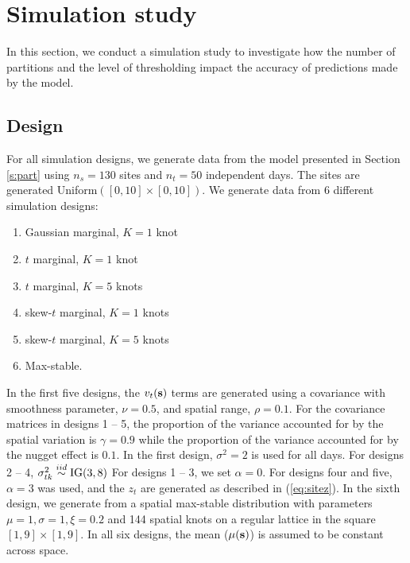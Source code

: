 \documentclass[11pt]{article}
\begin{document}
\section{Simulation study}\label{s:simstudy}
In this section, we conduct a simulation study to investigate how the number of partitions and the level of thresholding impact the accuracy of predictions made by the model.

\subsection{Design}\label{s:simdesign}
For all simulation designs, we generate data from the model presented in Section \ref{s:part} using $n_s=130$ sites and $n_t=50$ independent days.
The sites are generated Uniform$([0, 10] \times [0, 10])$.
We generate data from 6 different simulation designs:
\begin{enumerate} \setlength{\itemsep}{-0.5em}
  \item Gaussian marginal, $K=1$ knot
  \item $t$ marginal, $K=1$ knot
  \item $t$ marginal, $K=5$ knots
  \item skew-$t$ marginal, $K=1$ knots
  \item skew-$t$ marginal, $K=5$ knots
  \item Max-stable.
\end{enumerate}
In the first five designs, the $v_t(\mbox{\bf s})$ terms are generated using a \Matern covariance with smoothness parameter, $\nu = 0.5$, and spatial range, $\rho = 0.1$.
For the covariance matrices in designs 1 -- 5, the proportion of the variance accounted for by the spatial variation is $\gamma = 0.9$ while the proportion of the variance accounted for by the nugget effect is $0.1$.
In the first design, $\sigma^2 = 2$ is used for all days.
For designs 2 -- 4, $\sigma^2_{tk} \stackrel{iid}{\sim} \text{IG}(3, 8)$
For designs 1 -- 3, we set $\alpha = 0$.
For designs four and five, $\alpha = 3$ was used, and the $z_t$ are generated as described in (\ref{eq:sitez}).
In the sixth design, we generate from a spatial max-stable distribution \citep{Reich2012} with parameters $\mu = 1, \sigma=1, \xi=0.2$ and 144 spatial knots on a regular lattice in the square $[1, 9] \times [1, 9]$.
In all six designs, the mean ($\mu(\mbox{\bf s})$) is assumed to be constant across space.
\end{document}
